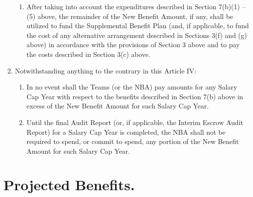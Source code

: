 \documentclass[
]{book}
\providecommand{\tightlist}{%
  \setlength{\itemsep}{0pt}\setlength{\parskip}{0pt}}
\begin{document}
\begin{enumerate}
\begin{enumerate}
  \item
    After taking into account the expenditures described in Section 7(b)(1) -- (5) above, the remainder of the New Benefit Amount, if any, shall be utilized to fund the Supplemental Benefit Plan (and, if applicable, to fund the cost of any alternative arrangement described in Sections 3(f) and (g) above) in accordance with the provisions of Section 3 above and to pay the costs described in Section 3(c) above.
  \end{enumerate}
\item
  Notwithstanding anything to the contrary in this Article IV:

  \begin{enumerate}
  \def\labelenumii{(\arabic{enumii})}
  \tightlist
  \item
    In no event shall the Teams (or the NBA) pay amounts for any Salary Cap Year with respect to the benefits described in Section 7(b) above in excess of the New Benefit Amount for such Salary Cap Year.
  \item
    Until the final Audit Report (or, if applicable, the Interim Escrow Audit Report) for a Salary Cap Year is completed, the NBA shall not be required to spend, or commit to spend, any portion of the New Benefit Amount for such Salary Cap Year.
  \end{enumerate}
\end{enumerate}

\hypertarget{projected-benefits.}{%
\section{Projected Benefits.}\label{projected-benefits.}}
\end{document}
